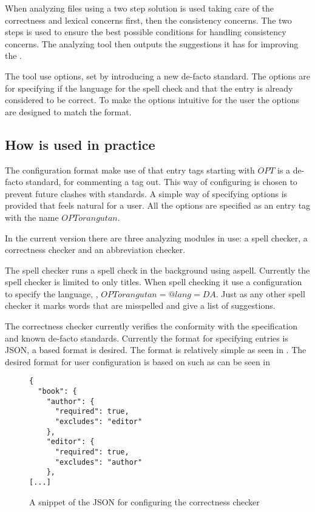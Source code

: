 When analyzing {\bibtex} files using a two step solution is used
taking care of the correctness and lexical concerns first, then the
consistency concerns.  The two steps is used to ensure the best
possible conditions for handling consistency concerns.  The analyzing
tool then outputs the suggestions it has for improving the .

The tool use options, set by introducing a new de-facto standard.  The
options are for specifying if the language for the spell check and
that the entry is already considered to be correct.  To make the
options intuitive for the {\bibtex} user the options are designed to
match the {\bibtex} format.


\subsection{How {\orangutan} is used in practice}

The configuration format make use of that entry tags starting with
$OPT$ is a de-facto standard, for commenting a tag out.  This way of
configuring is chosen to prevent future clashes with standards.  A
simple way of specifying options is provided that feels natural for a
{\bibtex} user.  All the options are specified as an entry tag with
the name $OPTorangutan$.

In the current version there are three analyzing modules in use: a
spell checker, a correctness checker and an abbreviation checker.

The spell checker runs a spell check in the background using aspell.
Currently the spell checker is limited to only titles.  When spell
checking it use a configuration to specify the language, \eg,
$OPTorangutan = {@lang=DA}$.  Just as any other spell checker it marks
words that are misspelled and give a list of suggestions.

The correctness checker currently verifies the conformity with the
{\bibtex} specification and known de-facto standards.  Currently the
format for specifying entries is JSON, a {\bibtex} based format is
desired.  The format is relatively simple as seen in
.  The desired format for user
configuration is based on {\bibtex} such as can be seen in

\begin{figure}
  \centering
\begin{verbatim}
{
  "book": {
    "author": {
      "required": true,
      "excludes": "editor"
    },
    "editor": {
      "required": true,
      "excludes": "author"
    },
[...]
\end{verbatim}
  \caption{A snippet of the JSON for configuring the correctness checker}
  \label{fig:correctness_checker_json}
\end{figure}

